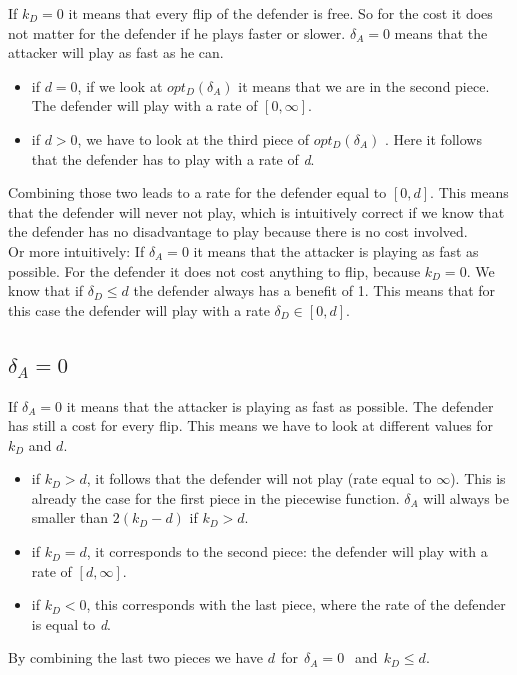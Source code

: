 If $k_{D}=0$ it means that every flip of the defender is free. So for the cost it does not matter for the defender if he plays faster or slower. $\delta_{A}=0$ means that the attacker will play as fast as he can.  
\begin{itemize}
\item if $d=0$, if we look at $opt_{D}(\delta_{A})$ it means that we are in the second piece. The defender will play with a rate of $[0,\infty]$. 
\item if $d >0$, we have to look at the third piece of  $opt_{D}(\delta_{A})$ . Here it follows that the defender has to play with a rate of \textit{d}.
\end{itemize}

Combining those two leads to a rate for the defender equal to $[0,d]$. This means that the defender will never not play, which is intuitively correct if we know that the defender has no disadvantage to play because there is no cost involved.\\

Or more intuitively: If $\delta_{A}=0$ it means that the attacker is playing as fast as possible. For the defender it does not cost anything to flip, because $k_{D}=0$. We know that if $\delta_{D} \leq d$ the defender always has a benefit of 1. This means that for this case the defender will play with a rate $\delta_{D} \in [0,d]$.\\
\subsection*{$\delta_{A}=0$}
If $\delta_{A}=0$ it means that the attacker is playing as fast as possible. The defender has still a cost for every flip. This means we have to look at different values for $k_{D}$ and $d$.
\begin{itemize}
\item if $k_{D} > d$, it follows that the defender will not play (rate equal to $\infty$). This is already the case for the first piece in the piecewise function. $\delta_{A}$ will always be smaller than $2(k_{D}-d)$ if $k_{D} > d.$
\item if $k_{D}=d$, it corresponds to the second piece: the defender will play with a rate of $[d,\infty]$.
\item if $k_{D} < 0$, this corresponds with the last piece, where the rate of the defender is equal to \textit{d}.
\end{itemize}
By combining the last two pieces we have  $d ~~$for$~~ \delta_{A} =0 ~~$ and$ ~~k_{D} \leq d$.\\

